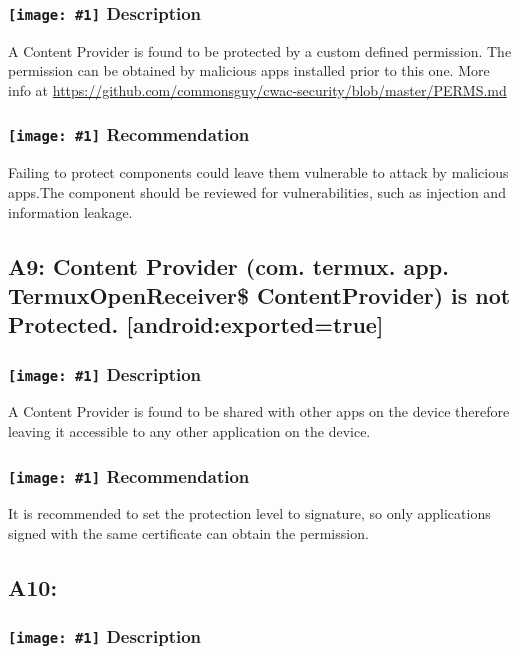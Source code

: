\documentclass[12p]{article}
\newcommand{\icon}[1]{\texttt{[image: \#1]}}
\begin{document}
\subsubsection*{\protect\icon{/home/miki/Documents/GITHUB/AndroidPermissions/python/vulns/report_icons/basic_sheet.png} Description}
A Content Provider is found to be protected by a custom defined permission. The permission can be obtained by malicious apps installed prior to this one. More info at \url{https://github.com/commonsguy/cwac-security/blob/master/PERMS.md}
\subsubsection*{\protect\icon{/home/miki/Documents/GITHUB/AndroidPermissions/python/vulns/report_icons/basic_todo.png} Recommendation}
Failing to protect components could leave them vulnerable to attack by malicious apps.The component should be reviewed for vulnerabilities, such as injection and information leakage. 
\subsection{A9: Content Provider (com. termux. app. TermuxOpenReceiver\$ ContentProvider) is not Protected. [android:exported=true]}
\subsubsection*{\protect\icon{/home/miki/Documents/GITHUB/AndroidPermissions/python/vulns/report_icons/basic_sheet.png} Description}
A Content Provider is found to be shared with other apps on the device therefore leaving it accessible to any other application on the device.
\subsubsection*{\protect\icon{/home/miki/Documents/GITHUB/AndroidPermissions/python/vulns/report_icons/basic_todo.png} Recommendation}
It is recommended to set the protection level to signature, so only applications signed with the same certificate can obtain the permission.
\subsection{A10: }
\subsubsection*{\protect\icon{/home/miki/Documents/GITHUB/AndroidPermissions/python/vulns/report_icons/basic_sheet.png} Description}
\end{document}
